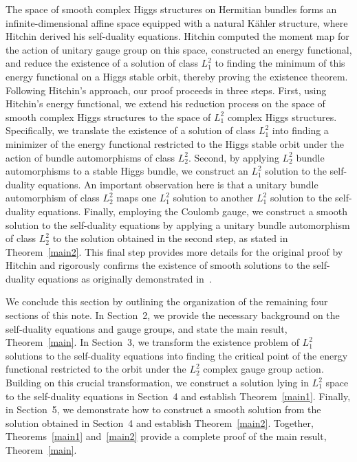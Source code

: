 \documentclass[a4paper]{amsart}
\theoremstyle{definition}
\theoremstyle{remark}
\numberwithin{equation}{section}
\begin{document}
The space of smooth complex Higgs structures on Hermitian bundles forms an infinite-dimensional affine space equipped with a natural Kähler structure, where Hitchin derived his self-duality equations. Hitchin computed the moment map for the action of unitary gauge group on this space, constructed an energy functional, and reduce the existence of a solution of class $L_1^2$ to finding the minimum of this energy functional on a Higgs stable orbit, thereby proving the existence theorem. Following Hitchin's approach, our proof proceeds in three steps. First, using Hitchin's energy functional, we extend his reduction process on the space of smooth complex Higgs structures to the space of $L_1^2$ complex Higgs structures. Specifically, we translate the existence of a solution of class $L_1^2$ into finding a minimizer of the energy functional restricted to the Higgs stable orbit under the action of bundle automorphisms of class $L_2^2$. Second, by applying $L_2^2$ bundle automorphisms to a stable Higgs bundle, we construct an $L_1^2$ solution to the self-duality equations. An important observation here is that a unitary bundle automorphism of class $L_2^2$ maps one $L_1^2$ solution to another $L_1^2$ solution to the self-duality equations. Finally, employing the Coulomb gauge, we construct a smooth solution to the self-duality equations by applying a unitary bundle automorphism of class $L_2^2$ to the solution obtained in the second step, as stated in Theorem~\ref{main2}. This final step provides more details for the original proof by Hitchin and rigorously confirms the existence of smooth solutions to the self-duality equations as originally demonstrated in~\cite[Theorem~4.3]{hitchin1987self}.

We conclude this section by outlining the organization of the remaining four sections of this note. In Section~2, we provide the necessary background on the self-duality equations and gauge groups, and state the main result, Theorem~\ref{main}. In Section~3, we transform the existence problem of $L_1^2$ solutions to the self-duality equations into finding the critical point of the energy functional restricted to the orbit under the $L_2^2$ complex gauge group action. Building on this crucial transformation, we construct a solution lying in $L_1^2$ space to the self-duality equations in Section~4 and establish Theorem~\ref{main1}. Finally, in Section~5, we demonstrate how to construct a smooth solution from the solution obtained in Section~4 and establish Theorem~\ref{main2}. Together, Theorems~\ref{main1} and~\ref{main2} provide a complete proof of the main result, Theorem~\ref{main}.
\end{document}
